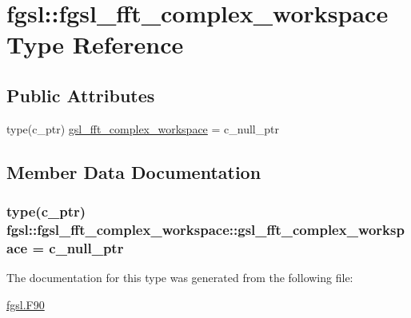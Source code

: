 \hypertarget{structfgsl_1_1fgsl__fft__complex__workspace}{\section{fgsl\-:\-:fgsl\-\_\-fft\-\_\-complex\-\_\-workspace Type Reference}
\label{structfgsl_1_1fgsl__fft__complex__workspace}
}
\subsection*{Public Attributes}
\begin{DoxyCompactItemize}
\item 
type(c\-\_\-ptr) \hyperlink{structfgsl_1_1fgsl__fft__complex__workspace_abf8e2a8cf8e6a49c3098df94237f95e3}{gsl\-\_\-fft\-\_\-complex\-\_\-workspace} = c\-\_\-null\-\_\-ptr
\end{DoxyCompactItemize}


\subsection{Member Data Documentation}
\hypertarget{structfgsl_1_1fgsl__fft__complex__workspace_abf8e2a8cf8e6a49c3098df94237f95e3}{
\subsubsection[{gsl\-\_\-fft\-\_\-complex\-\_\-workspace}]{\setlength{\rightskip}{0pt plus 5cm}type(c\-\_\-ptr) fgsl\-::fgsl\-\_\-fft\-\_\-complex\-\_\-workspace\-::gsl\-\_\-fft\-\_\-complex\-\_\-workspace = c\-\_\-null\-\_\-ptr}}\label{structfgsl_1_1fgsl__fft__complex__workspace_abf8e2a8cf8e6a49c3098df94237f95e3}


The documentation for this type was generated from the following file\-:\begin{DoxyCompactItemize}
\item 
\hyperlink{fgsl_8F90}{fgsl.\-F90}\end{DoxyCompactItemize}
